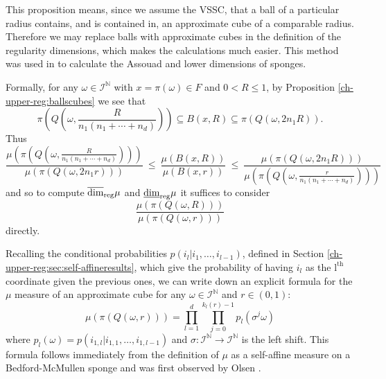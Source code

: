 This proposition means, since we assume the VSSC, that a ball of a particular radius contains, and is contained in, an approximate cube of a comparable radius.  Therefore we may replace balls with approximate cubes in the definition of the regularity dimensions, which makes the calculations much easier. This method was used in \cite[Proposition 3.1 and 3.5]{fraser-howroyd1} to calculate the Assouad and lower dimensions of sponges. 

Formally, for any $\omega \in \mathcal{I}^{\mathbb{N}}$ with $x= \pi(\omega) \in F$ and $0<R\le 1$, by Proposition \ref{ch-upper-reg:ballscubes} we see that
\[
\pi(Q(\omega, \frac{R}{n_1(n_1+ \cdots + n_d)}))  \subseteq B(x,R) \subseteq \pi (Q(\omega,2 n_1 R)).
\]
Thus
\[
\frac{\mu \left(\pi \left(Q\left(\omega,\frac{R}{n_1(n_1+ \cdots + n_d)}\right)\right)\right)} {\mu(\pi(Q(\omega,2n_1 r)))} \ \leq \  \frac{\mu(B(x,R))}{\mu(B(x,r))}  \ \leq \ \frac{\mu(\pi(Q(\omega,2n_1 R)))}{\mu \left(\pi \left(Q\left(\omega,\frac{r}{n_1(n_1+ \cdots + n_d)}\right)\right)\right)}
\]
and so to compute $\overline{\dim}_{\textup{reg}} \mu$ and $\underline{\dim}_{\textup{reg}} \mu$ it suffices to consider 
\[
\frac{\mu(\pi(Q(\omega,R)))}{\mu(\pi(Q(\omega,r)))} 
\]
directly.  


Recalling the conditional probabilities $p(i_{l}\vert i_{1},\ldots,i_{l-1})$, defined in Section \ref{ch-upper-reg:sec:self-affineresults}, which give the probability of having $i_{l}$ as the $\text{l}^{\text{th}}$ coordinate given the previous ones, we can write down an explicit formula for the $\mu $ measure of an approximate cube for any $\omega \in \mathcal{I}^{\mathbb{N}}$ and $r \in (0,1)$:
\begin{equation} \label{ch-upper-reg:approxcubemeasure}
\mu(\pi(Q(\omega,r)))=\prod^d_{l=1} \prod_{j=0}^{k_l(r)-1}p_l(\sigma^j\omega)
\end{equation}
where $p_l(\omega)=p(i_{1,l}\vert i_{1,1},\ldots,i_{1,l-1})$ and $\sigma: \mathcal{I}^{\mathbb{N}} \to \mathcal{I}^{\mathbb{N}}$ is the left shift. This formula follows immediately from the definition of $\mu$ as a self-affine measure on a Bedford-McMullen sponge and was first observed by Olsen \cite[Equation 6.2]{sponges}.

